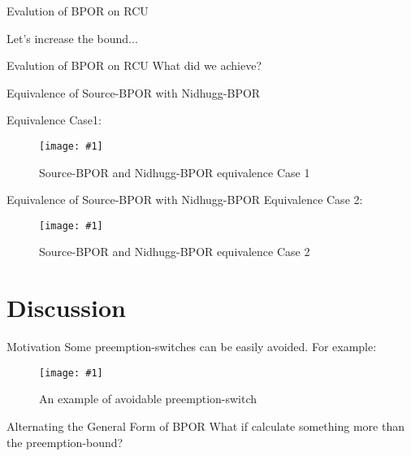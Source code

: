 \documentclass[9pt]{beamer}
\newcommand{\trace}[2]{
\begin{figure}[H]
\centering
\texttt{[image: \#1]}
\caption{#2}
\label{#2}
\end{figure}
}
\newcommand{\bigtabular}[2]{
 \begin{table} 
   \resizebox{\linewidth}{!}{
      
    }
    \caption{#2}
    \label{#2}
 \end{table}
}
\begin{document}
\begin{frame}{Evalution of BPOR on RCU}

Let's increase the bound...
\bigtabular{../tables/naivevsbpor4.tex}{RCU results for bound $b=4$}

\end{frame}

\begin{frame}{Evalution of BPOR on RCU}
What did we achieve?

\bigtabular{../tables/dporvsbporpriority.tex}{Comparison between DPOR and BPOR}

\end{frame}

\begin{frame}{Equivalence of Source-BPOR with Nidhugg-BPOR}

    Equivalence Case1:

\trace{../img/equivalence_case1w.pdf}{Source-BPOR and Nidhugg-BPOR equivalence Case 1}
    
\end{frame}

\begin{frame}{Equivalence of Source-BPOR with Nidhugg-BPOR}
    Equivalence Case 2:
   \trace{../img/equivalence_case2.pdf}{Source-BPOR and Nidhugg-BPOR equivalence Case 2}
    
\end{frame}

\section{Discussion}

\begin{frame}{Motivation}
Some preemption-switches can be easily avoided. For example:

\trace{../img/motivation.pdf}{An example of avoidable preemption-switch}
    
\end{frame}

\begin{frame}{Alternating the General Form of BPOR}
What if calculate something more than the preemption-bound?
    
\begin{figure}
    
\end{figure}
    
\end{frame}
\end{document}
